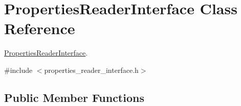 \hypertarget{classPropertiesReaderInterface}{}\section{Properties\+Reader\+Interface Class Reference}
\label{classPropertiesReaderInterface}


\hyperlink{classPropertiesReaderInterface}{Properties\+Reader\+Interface}.  




{\ttfamily \#include $<$properties\+\_\+reader\+\_\+interface.\+h$>$}

\subsection*{Public Member Functions}
